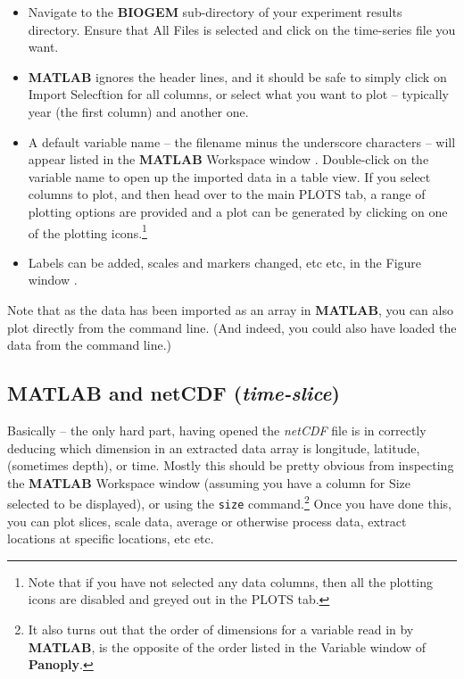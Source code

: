 \documentclass[11pt,fleqn]{book} %
\begin{document}
\begin{itemize}
\vspace{1pt}
\item Navigate to the \textbf{BIOGEM} sub-directory of your experiment results directory. Ensure that \footnotesize\textsf{All Files }\normalsize is selected and click on the time-series file you want.
\vspace{1pt}
\item \textbf{MATLAB} ignores the header lines, and it should be safe to simply click on \footnotesize\textsf{Import Selecftion }\normalsize for all columns, or select what you want to plot -- typically year (the first column) and another one.
\vspace{1pt}
\item A default variable name -- the filename minus the underscore characters -- will appear listed in the \textbf{MATLAB} \footnotesize\textsf{Workspace window }\normalsize. Double-click on the variable name to open up the imported data in a table view. If you select columns to plot, and then head over to the main \footnotesize\textsf{PLOTS }\normalsize tab, a range of plotting options are provided and a plot can be generated by clicking on one of the plotting icons.\footnote{Note that if you have not selected any data columns, then all the plotting icons are disabled and greyed out in the \footnotesize\textsf{PLOTS }\normalsize tab.}
\vspace{1pt}
\item Labels can be added, scales and markers changed, etc etc, in the \footnotesize\textsf{Figure window }\normalsize.
\end{itemize}
\vspace{2pt}

Note that as the data has been imported as an array in \textbf{MATLAB}, you can also plot directly from the command line. (And indeed, you could also have loaded the data from the command line.)


\subsection{MATLAB and netCDF (\textit{time-slice})}

\noindent Basically -- the only hard part, having opened the \textit{netCDF} file is in correctly deducing which dimension in an extracted data array is   longitude, latitude, (sometimes depth), or time. Mostly this should be pretty obvious from inspecting the \textbf{MATLAB} \footnotesize\textsf{Workspace }\normalsize window (assuming you have a column for \footnotesize\textsf{Size }\normalsize selected to be displayed), or using the \texttt{size} command.\footnote{It also turns out that the order of dimensions for a variable read in by \textbf{MATLAB}, is the opposite of the order listed in the \textsf{Variable} window of \textbf{Panoply}.} Once you have done this, you can plot slices, scale data, average or otherwise process data, extract locations at specific locations, etc etc.
\end{document}
